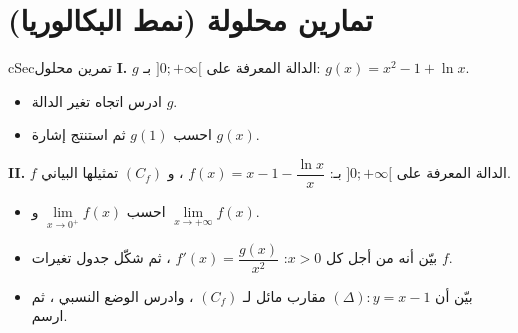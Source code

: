 \documentclass[12pt,a4paper]{article}
\newenvironment{BOX}[2]{\begin{otherlanguage}{english}\begin{arbox}{#1}{#2}}{\end{arbox}\end{otherlanguage}}
\newcounter{exo}
\newenvironment{sq}{\begin{itemize}[leftmargin=2.4em,itemsep=3pt]}{\end{itemize}}
\newcommand{\qa}{\item[(أ)]}\newcommand{\qb}{\item[(ب)]}\newcommand{\qc}{\item[(جـ)]}\newcommand{\qd}{\item[(د)]}\newcommand{\qe}{\item[(هـ)]}
\newenvironment{tmr}{\stepcounter{exo}\begin{BOX}{cSec}{تمرين محلول \theexo}}{\end{BOX}}
\let\origNeedspace\Needspace
\begin{document}
\origNeedspace{26\baselineskip}\section{تمارين محلولة (نمط البكالوريا)}
\begin{tmr}
\textbf{I.} $g$ الدالة المعرفة على $]0;+\infty[$ بـ: $g(x)=x^{2}-1+\ln x$.
\begin{sq}
\qa ادرس اتجاه تغير الدالة $g$.
\qb احسب $g(1)$ ثم استنتج إشارة $g(x)$.
\end{sq}
\textbf{II.} $f$ الدالة المعرفة على $]0;+\infty[$ بـ: $f(x)=x-1-\dfrac{\ln x}{x}$ ، و $(C_f)$ تمثيلها البياني.
\begin{sq}
\qa احسب $\lim\limits_{x\to0^{+}}f(x)$ و $\lim\limits_{x\to+\infty}f(x)$.
\qb بيّن أنه من أجل كل $x>0$: $f'(x)=\dfrac{g(x)}{x^{2}}$ ، ثم شكّل جدول تغيرات $f$.
\qc بيّن أن $(\Delta):y=x-1$ مقارب مائل لـ $(C_f)$ ، وادرس الوضع النسبي ، ثم ارسم.
\end{sq}
\end{tmr}
\end{document}
